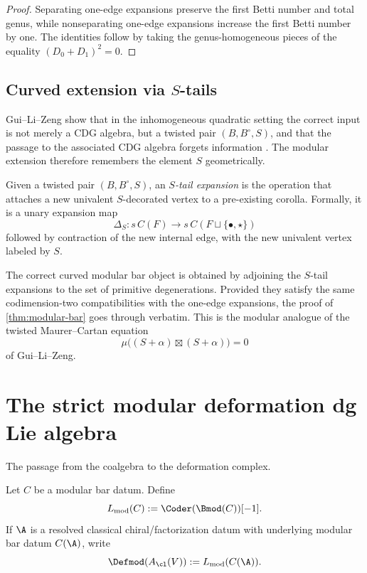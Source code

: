 \begin{proof}
Separating one-edge expansions preserve the first Betti number and total genus, while
nonseparating one-edge expansions increase the first Betti number by one. The identities
follow by taking the genus-homogeneous pieces of the equality $(D_0+D_1)^2=0$.
\end{proof}

\subsection{Curved extension via $S$-tails}

Gui--Li--Zeng show that in the inhomogeneous quadratic setting the correct input is not
merely a CDG algebra, but a twisted pair $(B,B^\circ,S)$, and that the passage to the
associated CDG algebra forgets information \cite{GLZ22}. The modular extension
therefore remembers the element $S$ geometrically.

\begin{definition}
Given a twisted pair $(B,B^\circ,S)$, an \emph{$S$-tail expansion} is the operation that
attaches a new univalent $S$-decorated vertex to a pre-existing corolla. Formally, it is
a unary expansion map
\[
\Delta_S:s\,C(F)\to s\,C(F\sqcup \{\bullet,\star\})
\]
followed by contraction of the new internal edge, with the new univalent vertex labeled by $S$.
\end{definition}

\begin{remark}
The correct curved modular bar object is obtained by adjoining the $S$-tail expansions
to the set of primitive degenerations. Provided they satisfy the same codimension-two
compatibilities with the one-edge expansions, the proof of \cref{thm:modular-bar} goes
through verbatim. This is the modular analogue of the twisted Maurer--Cartan equation
\[
\mu\big((S+\alpha)\boxtimes (S+\alpha)\big)=0
\]
of Gui--Li--Zeng.
\end{remark}

\section{The strict modular deformation dg Lie algebra}

The passage from the coalgebra to the deformation complex.

\begin{definition}
Let $C$ be a modular bar datum. Define
\[
L_{\mathrm{mod}}(C):=\Coder(\Bmod(C))[-1].
\]
If $\A$ is a resolved classical chiral/factorization datum with underlying modular bar datum
$C(\A)$, write
\[
\Defmod(A_{\cl}(V)):=L_{\mathrm{mod}}(C(\A)).
\]
\end{definition}

